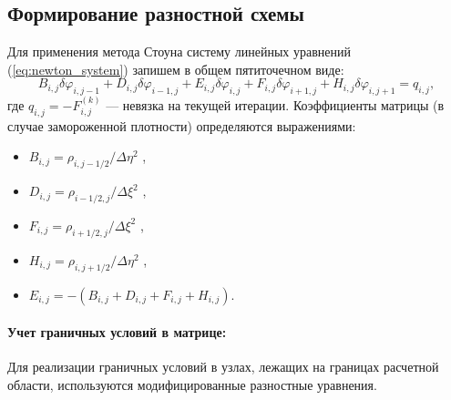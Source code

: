 \documentclass[a4paper,12pt]{article}
\begin{document}
	
	\subsection{Формирование разностной схемы }
	
	Для применения метода Стоуна систему линейных уравнений (\ref{eq:newton_system}) запишем в общем пятиточечном виде:
	\begin{equation}
		B_{i,j} \delta \varphi_{i,j-1} + D_{i,j} \delta \varphi_{i-1,j} + E_{i,j} \delta \varphi_{i,j} + F_{i,j} \delta \varphi_{i+1,j} + H_{i,j} \delta \varphi_{i,j+1} = q_{i,j},
		\label{eq:sip_stencil}
	\end{equation}
	где $q_{i,j} = -F_{i,j}^{(k)}$ — невязка на текущей итерации. Коэффициенты матрицы (в случае замороженной плотности) определяются выражениями:
	
	\begin{itemize}
		\item $B_{i,j} = \rho_{i,j-1/2} / \Delta \eta^2$ ,
		\item $D_{i,j} = \rho_{i-1/2,j} / \Delta \xi^2$ ,
		\item $F_{i,j} = \rho_{i+1/2,j} / \Delta \xi^2$ ,
		\item $H_{i,j} = \rho_{i,j+1/2} / \Delta \eta^2$ ,
		\item $E_{i,j} = -(B_{i,j} + D_{i,j} + F_{i,j} + H_{i,j})$.
	\end{itemize}

	\paragraph{Учет граничных условий в матрице:}
	Для реализации граничных условий в узлах, лежащих на границах расчетной области, используются модифицированные разностные уравнения. 
	
\end{document}

